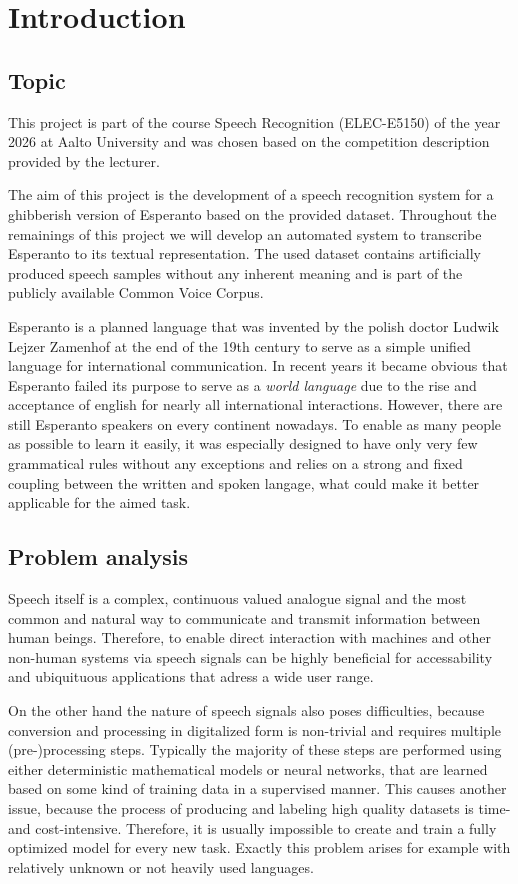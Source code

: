 \chapter{Introduction}
\label{intro}
\section{Topic}
\label{topic}
This project is part of the course Speech Recognition (ELEC-E5150) of the year 2026 at Aalto University and was chosen based on the competition description provided by the lecturer.

The aim of this project is the development of a speech recognition system for a ghibberish version of Esperanto based on the provided dataset.
Throughout the remainings of this project we will develop an automated system to transcribe Esperanto to its textual representation.
The used dataset contains artificially produced speech samples without any inherent meaning and is part of the publicly available Common Voice Corpus. 

Esperanto is a planned language that was invented by the polish doctor Ludwik Lejzer Zamenhof at the end of the 19th century to serve as a simple unified language for international communication.
In recent years it became obvious that Esperanto failed its purpose to serve as a \textit{world language} due to the rise and acceptance of english for nearly all international interactions.
However, there are still Esperanto speakers on every continent nowadays.
To enable as many people as possible to learn it easily, it was especially designed to have only very few grammatical rules without any exceptions and relies on a strong and fixed coupling between the written and spoken langage, what could make it better applicable for the aimed task.

\section{Problem analysis}
\label{problem}
Speech itself is a complex, continuous valued analogue signal and the most common and natural way to communicate and transmit information between human beings.
Therefore, to enable direct interaction with machines and other non-human systems via speech signals can be highly beneficial for accessability and ubiquituous applications that adress a wide user range.

On the other hand the nature of speech signals also poses difficulties, because conversion and processing in digitalized form is non-trivial and requires multiple (pre-)processing steps.
Typically the majority of these steps are performed using either deterministic mathematical models or neural networks, that are learned based on some kind of training data in a supervised manner.
This causes another issue, because the process of producing and labeling high quality datasets is time- and cost-intensive.
Therefore, it is usually impossible to create and train a fully optimized model for every new task.
Exactly this problem arises for example with relatively unknown or not heavily used languages. 

